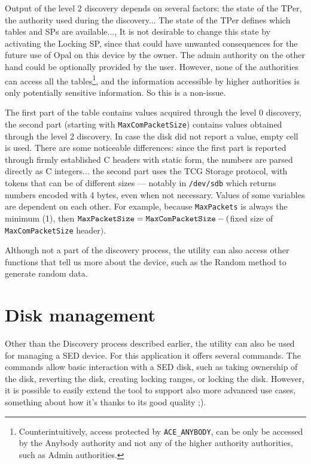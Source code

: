 Output of the level 2 discovery depends on several factors: the state of the TPer, the authority used during the discovery...
The state of the TPer defines which tables and SPs are available..., It is not desirable to change this state by activating the Locking SP, since that could have unwanted consequences for the future use of Opal on this device by the owner.
The admin authority on the other hand could be optionally provided by the user. However, none of the authorities can access all the tables\footnote{Counterintuitively, access protected by \texttt{ACE\_ANYBODY}, can be only be accessed by the Anybody authority and not any of the higher authority authorities, such as Admin authorities.}, and the information accessible by higher authorities is only potentially sensitive information. So this is a non-issue.

The first part of the table contains values acquired through the level 0 discovery, the second part (starting with \verb|MaxComPacketSize|) contains values obtained through the level 2 discovery. In case the disk did not report a value, empty cell is used.
There are some noticeable differences: since the first part is reported through firmly established C headers with static form, the numbers are parsed directly as C integers... the second part uses the TCG Storage protocol, with tokens that can be of different sizes --- notably in \verb|/dev/sdb| which returns numbers encoded with 4 bytes, even when not necessary.
Values of some variables are dependent on each other. For example, because \verb|MaxPackets| is always the minimum (1), then $\verb|MaxPacketSize| = \verb|MaxComPacketSize| - ($fixed size of \verb|MaxComPacketSize| header$)$.

Although not a part of the discovery process, the utility can also access other functions that tell us more about the device, such as the Random method to generate random data.



\section{Disk management}

Other than the Discovery process described earlier, the utility can also be used for managing a SED device. For this application it offers several commands.
The commands allow basic interaction with a SED disk, such as taking ownership of the disk, reverting the disk, creating locking ranges, or locking the disk. However, it is possible to easily extend the tool to support also more advanced use cases, something about how it's thanks to its good quality ;).

